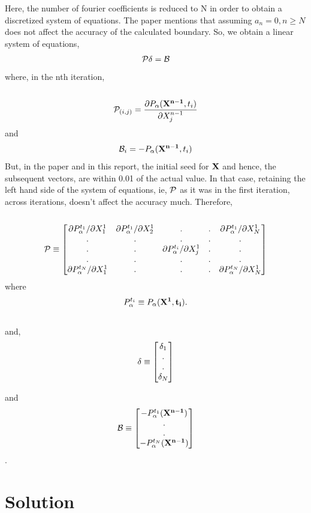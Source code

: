 \documentclass[10pt,a4paper,final]{report}
\begin{document}
Here, the number of fourier coefficients is reduced to N in order to obtain a discretized system of equations. The paper\cite{norbury} mentions that assuming $a_n = 0 , n \geq N$ does not affect the accuracy of the calculated boundary. 
%
So, we obtain a linear system of equations, 
\begin{equation}
	{\cal P} {\bf \delta} = {\cal B}
\end{equation}
%
where, in the nth iteration,\\
\\
\[
{\cal P}_{(i,j)} = \frac{\partial P_\alpha({\bf X^{n-1}},t_i)}{\partial X_j^{n-1}}
\] and \\
\[
{\cal B}_{i} = - P_\alpha({\bf X^{n-1}},t_i)
\]
But, in the paper and in this report, the initial seed for ${\bf X}$ and hence,
the subsequent vectors, are within 0.01 of the actual value. In that case, retaining the left hand side of the system of equations, ie, ${\cal P}$ as it was in the first iteration, across iterations, doesn't affect the accuracy much. Therefore, 
\\
\\
\[
{\cal P} \equiv  
\begin{bmatrix}
\partial P_\alpha^{t_1}/\partial X_1^1 & \partial P_\alpha^{t_1}/\partial X_2^1 & . & . & \partial P_\alpha^{t_1}/\partial X_N^1 \\ 
. & . & . & . & . \\ 
. & . & \partial P_\alpha^{t_i}/\partial X_j^1 & . & . \\ 
. & . & . & . & . \\ 
\partial P_\alpha^{t_N}/\partial X_1^1 & . & . & . & \partial P_\alpha^{t_N}/\partial X_N^1
\end{bmatrix} 
\]
where 
\[
P_\alpha^{t_i} \equiv P_\alpha(\bf{X^1},t_i).
\] 
%
\\
and,
\[
\bf \delta \equiv
\begin{bmatrix}
\delta_1 \\
. \\
. \\
\delta_N
\end{bmatrix}
\]

and
\[
{\cal B} \equiv 
\begin{bmatrix}		
-P_\alpha^{t_1}({\bf X^{n-1}}) \\ 
. \\ 
. \\ 
-P_\alpha^{t_N}({\bf X^{n-1}})
\end{bmatrix} 
\].

\section{Solution}
\end{document}
